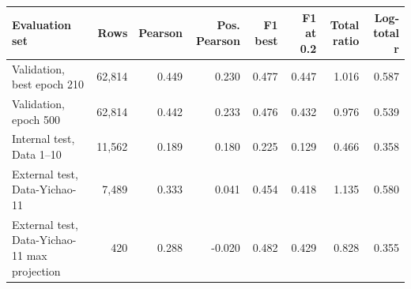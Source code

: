 \begin{tabular}{@{}lrrrrrrr@{}}
\toprule
Evaluation set & Rows & Pearson & Pos. Pearson & F1 best & F1 at 0.2 & Total ratio & Log-total r \\
\midrule
Validation, best epoch 210 & 62,814 & 0.449 & 0.230 & 0.477 & 0.447 & 1.016 & 0.587 \\
Validation, epoch 500 & 62,814 & 0.442 & 0.233 & 0.476 & 0.432 & 0.976 & 0.539 \\
Internal test, Data 1--10 & 11,562 & 0.189 & 0.180 & 0.225 & 0.129 & 0.466 & 0.358 \\
External test, Data-Yichao-11 & 7,489 & 0.333 & 0.041 & 0.454 & 0.418 & 1.135 & 0.580 \\
External test, Data-Yichao-11 max projection & 420 & 0.288 & -0.020 & 0.482 & 0.429 & 0.828 & 0.355 \\
\bottomrule
\end{tabular}
